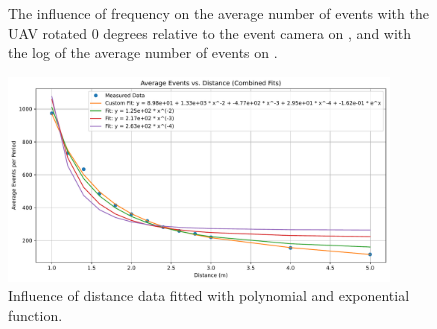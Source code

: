 \begin{figure}[htbp]
	\centering
	\caption{
  The influence of frequency on the average number of events with the UAV rotated 0 degrees relative to the event camera on , and with the log of the average number of events on .
  }
	\label{fig:freqs}
\end{figure}

\begin{figure}[htbp]
	\centering
	\includegraphics[width=0.90\textwidth]{./fig/plots/fit.pdf}
	\caption{Influence of distance data fitted with polynomial and exponential function.}
	\label{fig:fit1}
  \end{figure}

